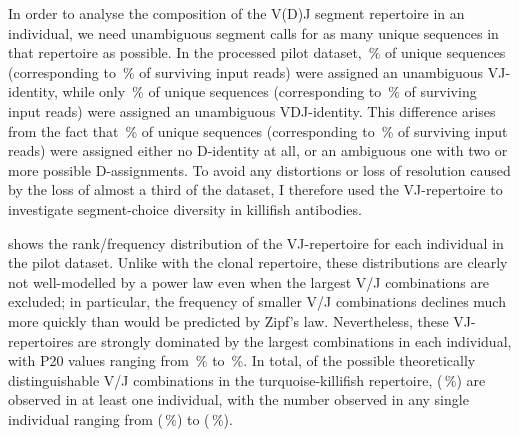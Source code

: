 In order to analyse the composition of the V(D)J segment repertoire in an individual, we need unambiguous segment calls for as many unique sequences in that repertoire as possible. In the processed pilot dataset, \,\% of unique sequences (corresponding to \,\% of surviving input reads) were assigned an unambiguous VJ-identity, while only \,\% of unique sequences (corresponding to \,\% of surviving input reads) were assigned an unambiguous VDJ-identity. This difference arises from the fact that \,\% of unique sequences (corresponding to \,\% of surviving input reads) were assigned either no D-identity at all, or an ambiguous one with two or more possible D-assignments. To avoid any distortions or loss of resolution caused by the loss of almost a third of the dataset, I therefore used the VJ-repertoire to investigate segment-choice diversity in killifish antibodies.

 shows the rank/frequency distribution of the VJ-repertoire for each individual in the pilot dataset. Unlike with the clonal repertoire, these distributions are clearly not well-modelled by a power law even when the largest V/J combinations are excluded; in particular, the frequency of smaller V/J combinations declines much more quickly than would be predicted by Zipf's law. Nevertheless, these VJ-repertoires are strongly dominated by the largest combinations in each individual, with P20 values ranging from \,\% to \,\%. In total, of the  possible theoretically distinguishable V/J combinations in the turquoise-killifish repertoire,  (\,\%) are observed in at least one individual, with the number observed in any single individual ranging from  (\,\%) to  (\,\%).

